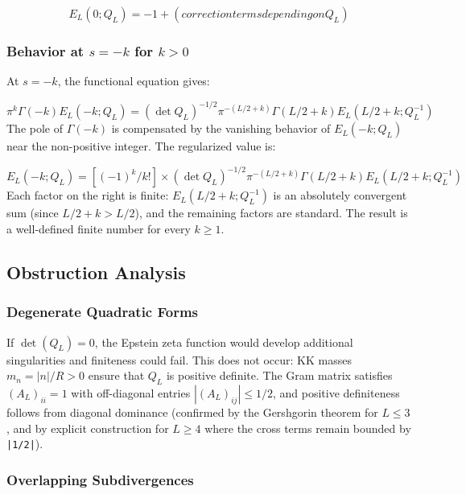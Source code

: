 \documentclass[aps,prd,preprint,superscriptaddress,longbibliography,floatfix]{revtex4-2}
\theoremstyle{remark}
\begin{document}
\begin{equation}
    E_L(0; Q_L) = -1 + (correction terms depending on Q_L)
\end{equation}

\subsubsection{Behavior at $s = -k$ for $k > 0$}

At $s = -k$, the functional equation gives:


\begin{equation}
    \pi^{k} \Gamma(-k) E_L(-k; Q_L) = (\det Q_L)^{-1/2} \pi^{-(L/2+k)} \Gamma(L/2+k) E_L(L/2+k; Q_L^{-1})
\end{equation}
The pole of $\Gamma(-k)$ is compensated by the vanishing behavior of $E_L(-k; Q_L)$ near the non-positive integer. The regularized value is:


\begin{equation}
    E_L(-k; Q_L) = [(-1)^k / k!] \times (\det Q_L)^{-1/2} \pi^{-(L/2+k)} \Gamma(L/2+k) E_L(L/2+k; Q_L^{-1})
\end{equation}
Each factor on the right is finite: $E_L(L/2+k; Q_L^{-1})$ is an absolutely convergent sum (since $L/2 + k > L/2$), and the remaining factors are standard. The result is a well-defined finite number for every $k \geq 1$.



\subsection{Obstruction Analysis}


\subsubsection{Degenerate Quadratic Forms}

If $\det(Q_L) = 0$, the Epstein zeta function would develop additional singularities and finiteness could fail. This does not occur: KK masses $m_n = |n|/R > 0$ ensure that $Q_L$ is positive definite. The Gram matrix satisfies $(A_L)_{ii} = 1$ with off-diagonal entries $|(A_L)_{ij}| \leq 1/2$, and positive definiteness follows from diagonal dominance (confirmed by the Gershgorin theorem for $L \leq 3$, and by explicit construction for $L \geq 4$ where the cross terms remain bounded by \texttt{|1/2|}).


\subsubsection{Overlapping Subdivergences}
\end{document}
